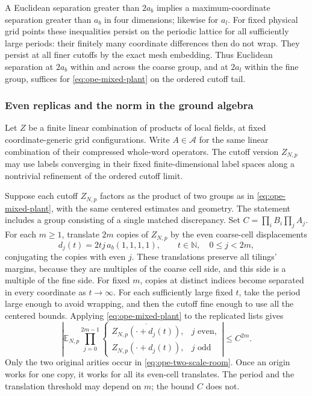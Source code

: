 A Euclidean separation greater than $2a_b$ implies a maximum-coordinate
separation greater than $a_b$ in four dimensions; likewise for $a_l$.
For fixed physical grid points these inequalities persist on the periodic
lattice for all sufficiently large periods: their finitely many coordinate
differences then do not wrap. They persist at all finer cutoffs by the
exact mesh embedding. Thus Euclidean separation at $2a_b$ within and
across the coarse group, and at $2a_l$ within the fine group, suffices
for \eqref{eq:ope-mixed-plant} on the ordered cutoff tail.

\subsubsection{Even replicas and the norm in the ground algebra}
Let $Z$ be a finite linear combination of products of local fields, at
fixed coordinate-generic grid configurations. Write $A\in\mathcal A$
for the same linear combination of their compressed whole-word
operators. The cutoff version $Z_{N,p}$ may use labels converging in their
fixed finite-dimensional label spaces along a nontrivial refinement of
the ordered cutoff limit.

Suppose each cutoff $Z_{N,p}$ factors as the product of two groups as in
\eqref{eq:ope-mixed-plant}, with the same centered estimates and
geometry. The statement includes a group consisting of a single
matched discrepancy. Set $C=\prod_iB_i\prod_jA_j$. For each $m\geq1$,
translate $2m$ copies of $Z_{N,p}$ by the even coarse-cell displacements
\[
 d_j(t)=2tj\,a_b(1,1,1,1),\qquad t\in\mathbb N,\quad 0\leq j<2m,
\]
conjugating the copies with even $j$. These translations preserve all
tilings' margins, because they are multiples of the coarse cell side,
and this side is a multiple of the fine side. For fixed $m$, copies at
distinct indices become separated in every coordinate as $t\to\infty$.
For each sufficiently large fixed $t$, take the period large enough to
avoid wrapping, and then the cutoff fine enough to use all the centered
bounds. Applying \eqref{eq:ope-mixed-plant} to the replicated lists gives
\begin{equation}\label{eq:ope-replica-price}
 \left|\mathbb E_{N,p}\prod_{j=0}^{2m-1}
       \begin{cases}\overline{Z_{N,p}(\cdot+d_j(t))},&j\text{ even},\\
                       Z_{N,p}(\cdot+d_j(t)),&j\text{ odd}
       \end{cases}\right|\leq C^{2m}.
\end{equation}
Only the two original arities occur in \eqref{eq:ope-two-scale-room}.
Once an origin works for one copy, it works for all its even-cell
translates. The period and the translation threshold may depend on $m$;
the bound $C$ does not.


